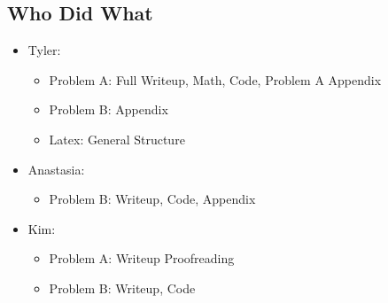 \documentclass[11pt]{article}  %
\begin{document}
\subsection{Who Did What}
\begin{itemize}
    \item Tyler:
    \begin{itemize}
        \item Problem A: Full Writeup, Math, Code, Problem A Appendix
        \item Problem B: Appendix
        \item Latex: General Structure
    \end{itemize}
    \item Anastasia:
    \begin{itemize}
        \item Problem B: Writeup, Code, Appendix
    \end{itemize}
    \item Kim:
    \begin{itemize}
        \item Problem A: Writeup Proofreading
        \item Problem B: Writeup, Code
    \end{itemize}
\end{itemize}
\label{sec:wdw}
\end{document}
